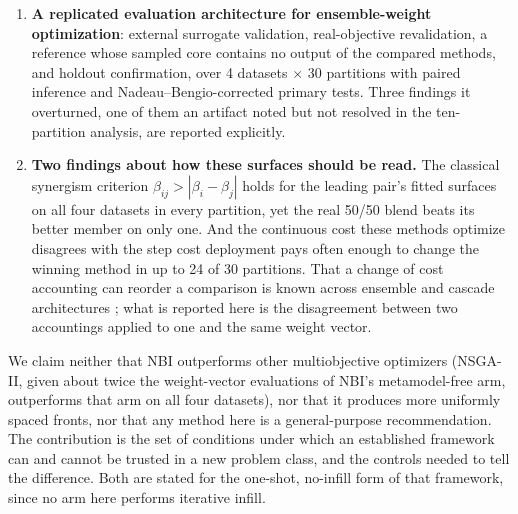 \begin{enumerate}
\item \textbf{A replicated evaluation architecture for ensemble-weight optimization}: external surrogate validation,
real-objective revalidation, a reference whose sampled core contains no output of the compared methods, and holdout
confirmation, over 4 datasets $\times$ 30 partitions with paired inference and Nadeau--Bengio-corrected primary tests.
Three findings it overturned, one of them an artifact noted but not resolved in the ten-partition analysis, are
reported explicitly.

\item \textbf{Two findings about how these surfaces should be read.} The classical synergism criterion $\beta_{ij} >
|\beta_i - \beta_j|$ holds for the leading pair's fitted surfaces on all four datasets in every partition, yet the
real 50/50 blend beats its better member on only one. And the continuous cost these methods optimize disagrees with
the step cost deployment pays often enough to change the winning method in up to 24 of 30 partitions. That a change
of cost accounting can reorder
a comparison is known across ensemble and cascade architectures \citep{wang2022committees}; what is reported here is
the disagreement between two accountings applied to one and the same weight vector.
\end{enumerate}

We claim neither that NBI outperforms other multiobjective optimizers (NSGA-II, given about twice the weight-vector
evaluations of NBI's metamodel-free arm, outperforms that arm on all four datasets), nor that it produces more
uniformly spaced fronts, nor that any method here is a general-purpose recommendation. The contribution is the set of
conditions under which an established framework can and cannot be trusted in a new problem class, and the controls
needed to tell the difference. Both are stated for the one-shot, no-infill form of that framework, since no arm here
performs iterative infill.
